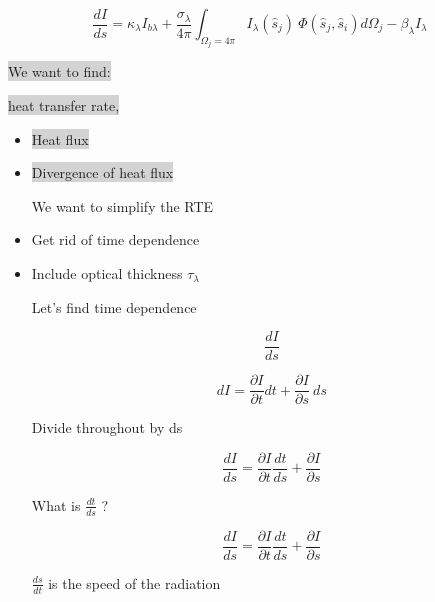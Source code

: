\documentclass[12pt]{article}
\renewcommand{\_}{\kern-1.5pt\textunderscore\kern-1.5pt}
\begin{document}
 \[ \frac{dI}{ds}= \kappa _{ \lambda }I_{b \lambda }+\frac{ \sigma _{ \lambda }}{4 \pi } \int _{ \Omega _{j}=4 \pi }^{}I_{ \lambda } \left( \hat{s}_{j} \right) ~ \Phi  \left( \hat{s}_{j},\hat{s}_{i} \right) d \Omega _{j}- \beta _{ \lambda }I_{ \lambda } \] \par

\colorbox{LightGray}{We want to find: }\par

\colorbox{LightGray}{heat transfer rate, }\par

\begin{itemize}
	\item \colorbox{LightGray}{Heat flux}\par

	\item \colorbox{LightGray}{Divergence of heat flux }\par

We want to simplify the RTE\par

	\item Get rid of time dependence\par

	\item Include optical thickness  \(  \tau_{ \lambda } \) \par

Let’s find time dependence\par

 \[ \frac{dI}{ds} \] \par

 \[ dI=\frac{ \partial I}{ \partial t} dt+\frac{ \partial I}{ \partial s}~ds \] \par

Divide throughout by ds\par

 \[ \frac{dI}{ds}=\frac{ \partial I}{ \partial t}\frac{dt}{ds}+\frac{ \partial I}{ \partial s} \] \par

What is  \( \frac{dt}{ds} \) ?\par

\par

 \[ \frac{dI}{ds}=\frac{ \partial I}{ \partial t}\frac{dt}{ds}+\frac{ \partial I}{ \partial s} \] \par

 \( \frac{ds}{dt} \)  is the speed of the radiation\par


\end{itemize}
\end{document}
